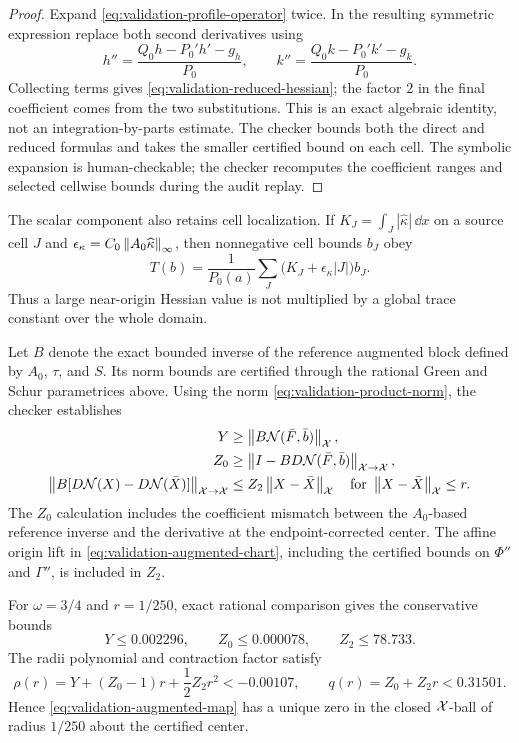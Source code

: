 \begin{proof}
Expand \eqref{eq:validation-profile-operator} twice.  In the resulting
symmetric expression replace both second derivatives using
\[
 h''=\frac{Q_0h-P_0'h'-g_h}{P_0},\qquad
 k''=\frac{Q_0k-P_0'k'-g_k}{P_0}.
\]
Collecting terms gives \eqref{eq:validation-reduced-hessian}; the factor $2$
in the final coefficient comes from the two substitutions.  This is an exact
algebraic identity, not an integration-by-parts estimate.  The checker bounds
both the direct and reduced formulas and takes the smaller certified bound on
each cell.  The symbolic expansion is human-checkable; the checker recomputes
the coefficient ranges and selected cellwise bounds during the audit replay.
\end{proof}

The scalar component also retains cell localization.  If
$K_J=\int_J|\widehat\kappa|\,\dd x$ on a source cell $J$ and
\(
 \epsilon_\kappa=C_0\left\lVert A_0\widehat\kappa\right\rVert_\infty
\), then nonnegative cell bounds $b_J$ obey
\begin{equation}
 T(b)=\frac1{P_0(a)}
  \sum_J\bigl(K_J+\epsilon_\kappa |J|\bigr)b_J.
 \label{eq:validation-weighted-trace}
\end{equation}
Thus a large near-origin Hessian value is not multiplied by a global trace
constant over the whole domain.

Let $B$ denote the exact bounded inverse of the reference augmented block
defined by $A_0$, $\tau$, and $S$.  Its norm bounds are certified through the
rational Green and Schur parametrices above.  Using the norm
\eqref{eq:validation-product-norm}, the checker establishes
\begin{align}
 Y&\geq\left\lVert B\mathcal N(\bar F,\bar b)\right\rVert_{\mathcal X},\nonumber\\
 Z_0&\geq\left\lVert I-BD\mathcal N(\bar F,\bar b)\right\rVert_{\mathcal X\to\mathcal X},\nonumber\\
 \left\lVert B[D\mathcal N(X)-D\mathcal N(\bar X)]\right\rVert_{\mathcal X\to\mathcal X}
   &\leq Z_2\left\lVert X-\bar X\right\rVert_{\mathcal X}
   \quad\text{for }\left\lVert X-\bar X\right\rVert_{\mathcal X}\leq r.
 \label{eq:validation-yz-bounds}
\end{align}
The $Z_0$ calculation includes the coefficient mismatch between the
$A_0$-based reference inverse and the derivative at the endpoint-corrected
center.  The affine origin lift in
\eqref{eq:validation-augmented-chart}, including the certified bounds on
$\Phi''$ and $\Gamma''$, is included in $Z_2$.

\begin{lemma}
\label{lem:validation-newton-closure}
For $\omega=3/4$ and $r=1/250$, exact rational comparison gives the
conservative bounds
\begin{equation}
 Y\leq0.002296,\qquad Z_0\leq0.000078,\qquad Z_2\leq78.733.
 \label{eq:validation-final-yz}
\end{equation}
The radii polynomial and contraction factor satisfy
\begin{equation}
 \rho(r)=Y+(Z_0-1)r+\frac12Z_2r^2<-0.00107,\qquad
 q(r)=Z_0+Z_2r<0.31501.
 \label{eq:validation-radii-polynomial}
\end{equation}
Hence \eqref{eq:validation-augmented-map} has a unique zero in the closed
$\mathcal X$-ball of radius $1/250$ about the certified center.
\end{lemma}

